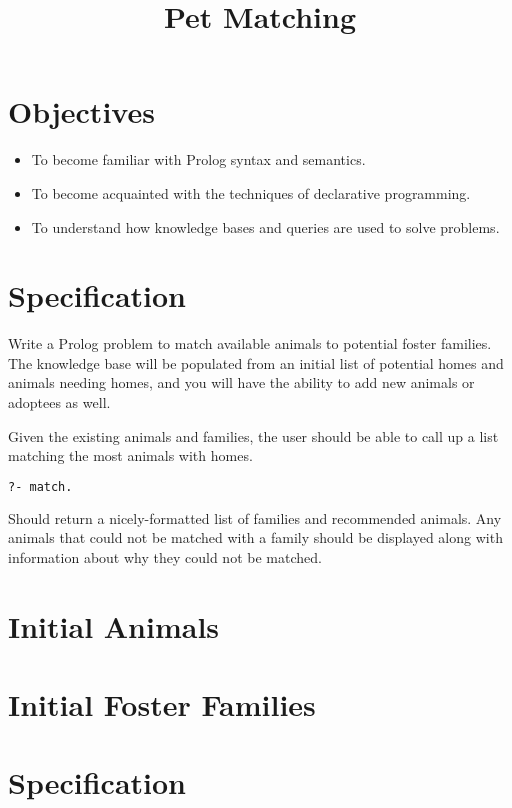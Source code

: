 \documentclass[12pt,info]{asg}
\title{Pet Matching}
\begin{document}
\maketitle
\section*{Objectives}
\begin{itemize}
\item To become familiar with Prolog syntax and semantics.
\item To become acquainted with the techniques of declarative programming.
\item To understand how knowledge bases and queries are used to solve problems.
\end{itemize}

\section*{Specification}
Write a Prolog problem to match available animals to potential foster families. The knowledge base will be populated from an initial list of potential homes and animals needing homes, and you will have the ability to add new animals or adoptees as well.

Given the existing animals and families, the user should be able to call up a list matching the most animals with homes.
\begin{lstlisting}[language=Lisp]
?- match.
\end{lstlisting}
Should return a nicely-formatted list of families and recommended animals. Any animals that could not be matched with a family should be displayed along with information about why they could not be matched.

\section*{Initial Animals}


\section*{Initial Foster Families}

\section*{Specification}
\end{document}

